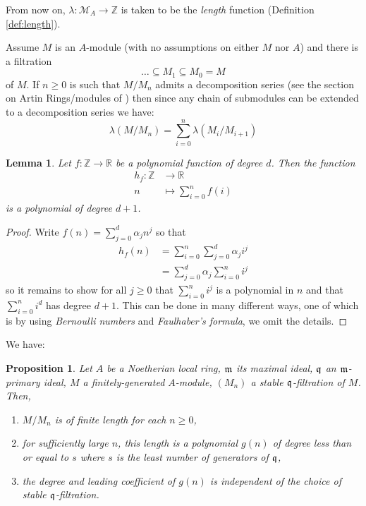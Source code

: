 \documentclass[12pt]{article}
\theoremstyle{plain}
\newtheorem{proposition}[thm]{Proposition}
\newtheorem{lemma}[thm]{Lemma}
\theoremstyle{definition}
\newcommand{\bb}[1]{\mathbb{#1}}
\newcommand{\call}[1]{\mathcal{#1}}
\newcommand{\lto}{\longrightarrow}
\begin{document}
From now on, $\lambda: \call{M}_A \lto \bb{Z}$ is taken to be the \emph{length} function (Definition \ref{def:length}).

Assume $M$ is an $A$-module (with no assumptions on either $M$ nor $A$) and there is a filtration
\[\hdots \subseteq M_1 \subseteq M_0 = M\] of $M$. If $n \geq 0$ is such that $M/M_n$ admits a decomposition series (see the section on Artin Rings/modules of \cite{com_alg_notes}) then since any chain of submodules can be extended to a decomposition series we have:
\begin{equation}
\label{eq:sum_lengths}
\lambda(M/M_n) = \sum_{i = 0}^n\lambda (M_i/M_{i+1})
\end{equation}
\begin{lemma}
\label{lem:polynomial_sum}
Let $f: \bb{Z} \lto \bb{R}$ be a polynomial function of degree $d$. Then the function
\begin{align*}
    h_f: \bb{Z} &\lto \bb{R}\\
    n &\mapsto \sum_{i = 0}^nf(i)
\end{align*}
is a polynomial of degree $d+1$.
\end{lemma}
\begin{proof}
Write $f(n) = \sum_{j = 0}^d \alpha_j n^j$ so that
\begin{align*}
    h_f(n) &= \sum_{i = 0}^n \sum_{j = 0}^d \alpha_j i^j\\
    &= \sum_{j = 0}^d \alpha_j\sum_{i = 0}^n i^j
\end{align*}
so it remains to show for all $j \geq 0$ that $\sum_{i = 0}^n i^j$ is a polynomial in $n$ and that $\sum_{i = 0}^ni^d$ has degree $d+1$. This can be done in many different ways, one of which is by using \emph{Bernoulli numbers} and \emph{Faulhaber's formula}, we omit the details.
\end{proof}
We have:
\begin{proposition}
\label{prop:Noeth_primary_fin_gen_filtration}
Let $A$ be a Noetherian local ring, $\frak{m}$ its maximal ideal, $\frak{q}$ an $\frak{m}$-primary ideal, $M$ a finitely-generated $A$-module, $(M_n)$ a stable $\frak{q}$-filtration of $M$. Then,
\begin{enumerate}
\item\label{prop:finite_length} $M/M_n$ is of finite length for each $n \geq 0$,
\item\label{prop:polynomial} for sufficiently large $n$, this length is a polynomial $g(n)$ of degree less than or equal to $s$ where $s$ is the least number of generators of $\frak{q}$,
\item\label{prop:leading_coefficient} the degree and leading coefficient of $g(n)$ is independent of the choice of stable $\frak{q}$-filtration.
\end{enumerate}
\end{proposition}
\end{document}
